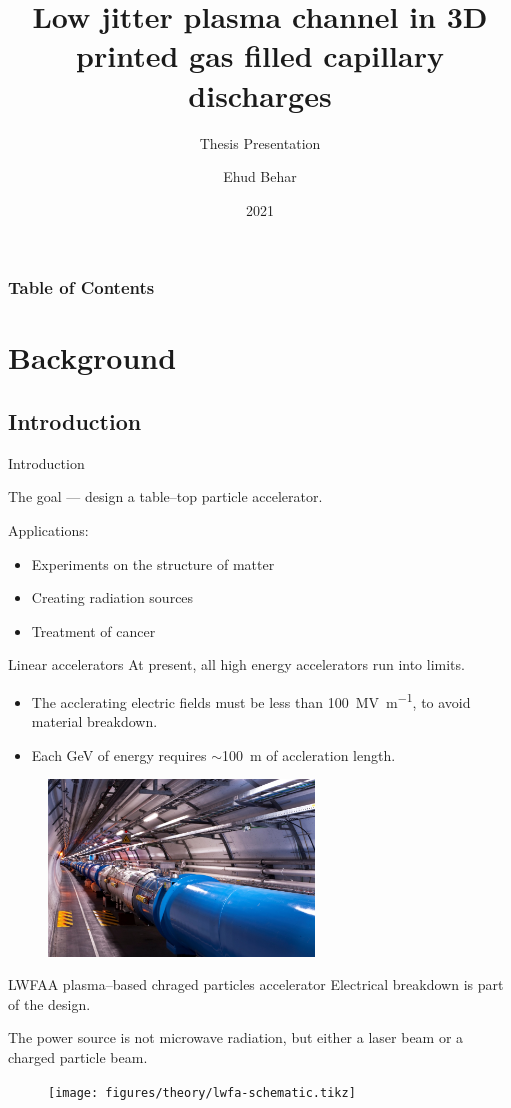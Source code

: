 \documentclass[dvipsnames]{beamer}
\title{Low jitter plasma channel in 3D printed gas filled capillary discharges}
\subtitle{Thesis Presentation}
\author{Ehud Behar}
\institute{Hebrew University of Jerusalem}
\date{2021}
\begin{document}
\frame{\titlepage}
\begin{frame}
\frametitle{Table of Contents}
\tableofcontents
\end{frame}

\section{Background}
\subsection{Introduction}
  \begin{frame}{Introduction}
  \begin{center}
    The goal --- design a table--top particle accelerator.
  \end{center}
    Applications:
    \begin{itemize}
        \item[\textbullet] Experiments on the structure of matter
        \item[\textbullet] Creating radiation sources
        \item[\textbullet] Treatment of cancer
    \end{itemize}
  \end{frame}

\begin{frame}{Linear accelerators}
At present, all high energy accelerators run into limits.
\begin{itemize}
\item[\textbullet] The acclerating electric fields must be less than \SI{100}{\mega \V \per\meter}, to avoid material breakdown.
\item[\textbullet] Each \si{\giga \eV} of energy requires $\sim$\SI{100}{\meter} of accleration length.
\end{itemize}
\begin{figure}
\includegraphics[width=200pt]{figures/theory/lhc_cern_compressed.jpg}
\end{figure}
\end{frame}
\begin{frame}{LWFA}{A plasma--based chraged particles accelerator}
Electrical breakdown is part of the design.

The power source is not microwave radiation, but either a laser beam or a charged particle beam.
\begin{figure}
\texttt{[image: figures/theory/lwfa-schematic.tikz]}
\end{figure}
\end{frame}
\end{document}
